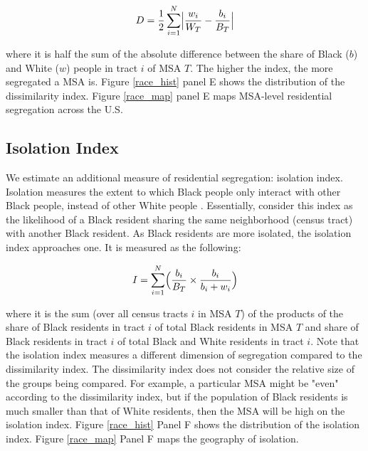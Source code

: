 \documentclass[11pt]{article}
\begin{document}
\begin{equation}
    \label{eq:dissim}
    D = \frac{1}{2} \sum_{i=1}^N \Bigl| \frac{w_i}{W_T} - \frac{b_i}{B_T} \Bigr|
\end{equation}

where it is half the sum of the absolute difference between the share of Black ($b$) and White ($w$) people in tract $i$ of MSA $T$. The higher the index, the more segregated a MSA is. Figure \ref{race_hist} panel E shows the distribution of the dissimilarity index. Figure \ref{race_map} panel E maps MSA-level residential segregation across the U.S.

\subsection{Isolation Index}

We estimate an additional measure of residential segregation: isolation index. Isolation measures the extent to which Black people only interact with other Black people, instead of other White people \citep{massey1988dimensions}. Essentially, consider this index as the likelihood of a Black resident sharing the same neighborhood (census tract) with another Black resident. As Black residents are more isolated, the isolation index approaches one. It is measured as the following:

\begin{equation}
    \label{eq:isolation}
    I = \sum_{i=1}^N \Bigl( \frac{b_i}{B_T} \times \frac{b_i}{b_i + w_i} \Bigr)
\end{equation}

where it is the sum (over all census tracts $i$ in MSA $T$) of the products of the share of Black residents in tract $i$ of total Black residents in MSA $T$ and share of Black residents in tract $i$ of total Black and White residents in tract $i$. Note that the isolation index measures a different dimension of segregation compared to the dissimilarity index. The dissimilarity index does not consider the relative size of the groups being compared. For example, a particular MSA might be "even" according to the dissimilarity index, but if the population of Black residents is much smaller than that of White residents, then the MSA will be high on the isolation index. Figure \ref{race_hist} Panel F shows the distribution of the isolation index. Figure \ref{race_map} Panel F maps the geography of isolation.
\end{document}
